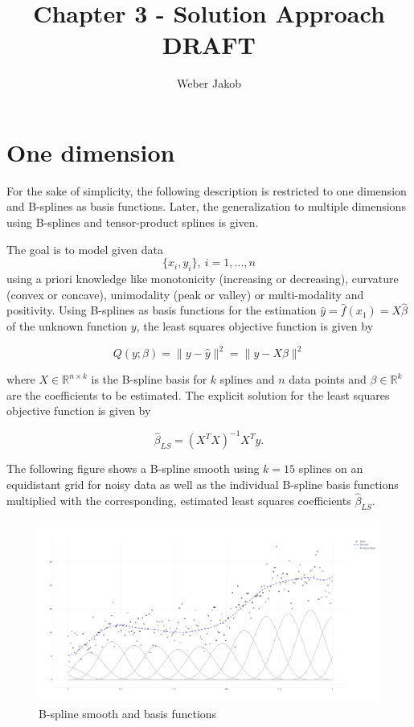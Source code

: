 \documentclass[10pt,a4paper]{article}
\title{Chapter 3 - Solution Approach DRAFT}
\author{Weber Jakob}
\begin{document}
	\maketitle
	
	\section{One dimension} \label{1D}
 	For the sake of simplicity, the following description is restricted to one dimension and B-splines as basis functions. Later, the generalization to multiple dimensions using B-splines and tensor-product splines is given. 
 
 	The goal is to model given data $$\{x_i, y_i\}, \ i = 1, ..., n$$ using a priori knowledge like monotonicity (increasing or decreasing), curvature (convex or concave), unimodality (peak or valley) or multi-modality and positivity. Using B-splines as basis functions for the estimation $\hat y =  \hat f(x_1) = X\hat \beta$ of the unknown function $y$, the least squares objective function is given by
	
	$$Q(y;\beta) = \lVert y - \hat y\rVert^2 = \lVert y - X\beta\rVert^2 $$
	
	where $X \in \mathbb{R}^{n \times k}$ is the B-spline basis for $k$ splines and $n$ data points and $\beta \in \mathbb{R}^k$ are the coefficients to be estimated. The explicit solution for the least squares objective function is given by
	
	$$\hat \beta_{LS}= (X^TX)^{-1}X^T y.$$
	
	The following figure shows a B-spline smooth using $k=15$ splines on an equidistant grid for noisy data as well as the individual B-spline basis functions multiplied with the corresponding, estimated least squares coefficients $\hat \beta_{LS}$.
	
	\begin{figure}[H]
		\centering
		\includegraphics[width=\linewidth]{thesisplots/smooth_plus_basis.pdf}
		\caption{B-spline smooth and basis functions}
		\label{fig:smooth_bf}
    \end{figure}
	
\end{document}
